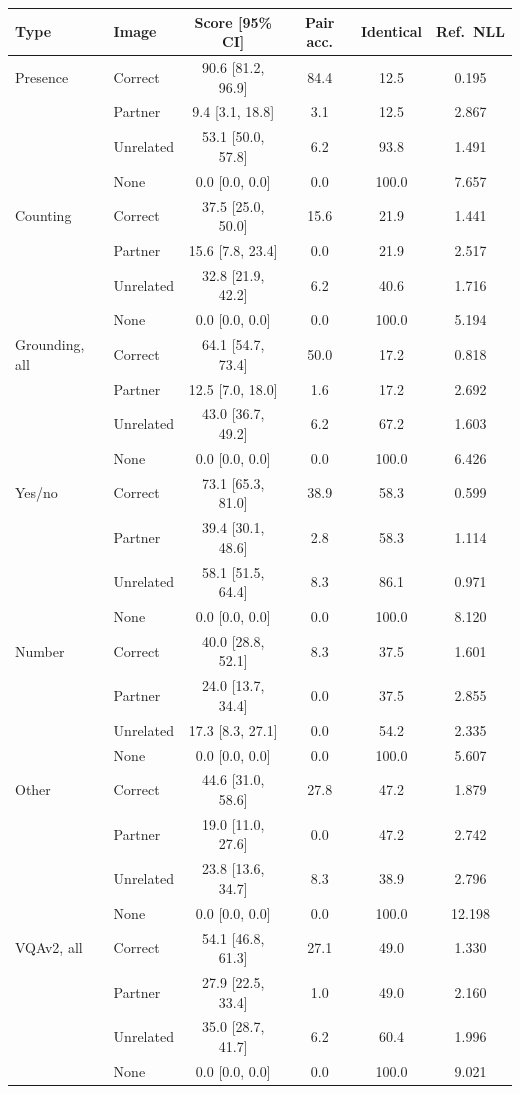 \begin{tabular}{llcccc}
\toprule
Type & Image & Score [95\% CI] & Pair acc. & Identical & Ref.\ NLL \\
\midrule
Presence & Correct & 90.6 [81.2, 96.9] & 84.4 & 12.5 & 0.195 \\
 & Partner & 9.4 [3.1, 18.8] & 3.1 & 12.5 & 2.867 \\
 & Unrelated & 53.1 [50.0, 57.8] & 6.2 & 93.8 & 1.491 \\
 & None & 0.0 [0.0, 0.0] & 0.0 & 100.0 & 7.657 \\
Counting & Correct & 37.5 [25.0, 50.0] & 15.6 & 21.9 & 1.441 \\
 & Partner & 15.6 [7.8, 23.4] & 0.0 & 21.9 & 2.517 \\
 & Unrelated & 32.8 [21.9, 42.2] & 6.2 & 40.6 & 1.716 \\
 & None & 0.0 [0.0, 0.0] & 0.0 & 100.0 & 5.194 \\
Grounding, all & Correct & 64.1 [54.7, 73.4] & 50.0 & 17.2 & 0.818 \\
 & Partner & 12.5 [7.0, 18.0] & 1.6 & 17.2 & 2.692 \\
 & Unrelated & 43.0 [36.7, 49.2] & 6.2 & 67.2 & 1.603 \\
 & None & 0.0 [0.0, 0.0] & 0.0 & 100.0 & 6.426 \\
Yes/no & Correct & 73.1 [65.3, 81.0] & 38.9 & 58.3 & 0.599 \\
 & Partner & 39.4 [30.1, 48.6] & 2.8 & 58.3 & 1.114 \\
 & Unrelated & 58.1 [51.5, 64.4] & 8.3 & 86.1 & 0.971 \\
 & None & 0.0 [0.0, 0.0] & 0.0 & 100.0 & 8.120 \\
Number & Correct & 40.0 [28.8, 52.1] & 8.3 & 37.5 & 1.601 \\
 & Partner & 24.0 [13.7, 34.4] & 0.0 & 37.5 & 2.855 \\
 & Unrelated & 17.3 [8.3, 27.1] & 0.0 & 54.2 & 2.335 \\
 & None & 0.0 [0.0, 0.0] & 0.0 & 100.0 & 5.607 \\
Other & Correct & 44.6 [31.0, 58.6] & 27.8 & 47.2 & 1.879 \\
 & Partner & 19.0 [11.0, 27.6] & 0.0 & 47.2 & 2.742 \\
 & Unrelated & 23.8 [13.6, 34.7] & 8.3 & 38.9 & 2.796 \\
 & None & 0.0 [0.0, 0.0] & 0.0 & 100.0 & 12.198 \\
VQAv2, all & Correct & 54.1 [46.8, 61.3] & 27.1 & 49.0 & 1.330 \\
 & Partner & 27.9 [22.5, 33.4] & 1.0 & 49.0 & 2.160 \\
 & Unrelated & 35.0 [28.7, 41.7] & 6.2 & 60.4 & 1.996 \\
 & None & 0.0 [0.0, 0.0] & 0.0 & 100.0 & 9.021 \\
\bottomrule
\end{tabular}
